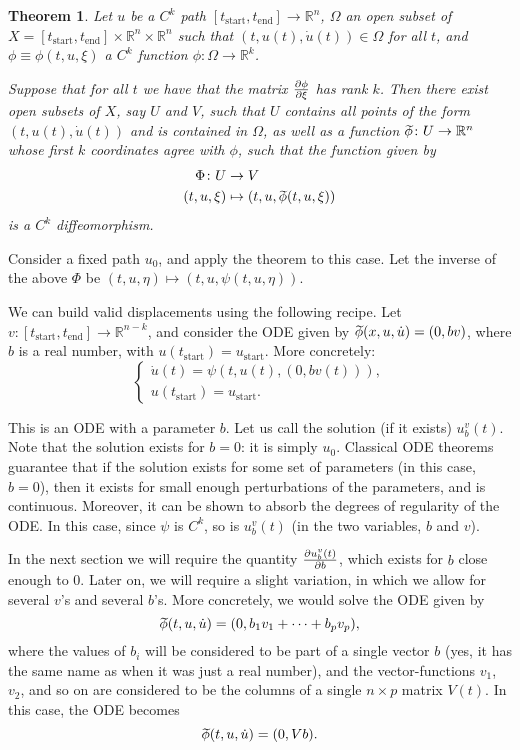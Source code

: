 \documentclass{article}
\newtheorem{theorem}{Theorem}
\theoremstyle{nonumberplain}
\theoremstyle{nonumberplain}
\newcommand{\R}{\mathbb{R}}
\newcommand{\tstart}{\mathrm{start}}
\newcommand{\tend}{\mathrm{end}}
\newcommand{\wtphi}{
  \mspace{2mu}
  \widetilde{\mspace{-2mu}\smash[t]{\phi}}
}
\begin{document}
\begin{theorem}
Let $u$ be a $C^k$ path $[t_\tstart,t_\tend] \to \R^n$, $\Omega$ an open subset of $X = [t_\tstart,t_\tend] \times \R^n \times \R^n$ such that $(t,u(t),\dot u(t)) \in \Omega$ for all $t$, and $\phi \equiv \phi(t,u,\xi)$ a $C^k$ function $\phi \colon \Omega \to \R^k$.

Suppose that for all $t$ we have that the matrix $\diffp\phi\xi$ has rank $k$. Then there exist open subsets of $X$, say $U$ and $V$, such that $U$ contains all points of the form $(t,u(t),\dot u(t))$ and is contained in $\Omega$, as well as a function $\wtphi \colon U \to \R^n$ whose first $k$ coordinates agree with $\phi$, such that the function given by
\begin{align*}
\Phi \colon U &\to V\\
(t,u,\xi) &\mapsto (t,u,\wtphi(t,u,\xi))
\end{align*}
is a $C^k$ diffeomorphism.
\end{theorem}

Consider a fixed path $u_0$, and apply the theorem to this case. Let the inverse of the above $\Phi$ be $(t,u,\eta) \mapsto (t,u,\psi(t,u,\eta))$.

We can build valid displacements using the following recipe. Let $v \colon [t_\tstart, t_\tend] \to \R^{n-k}$, and consider the ODE given by $\wtphi(x,u,\dot u) = (0, b v)$, where $b$ is a real number, with $u(t_\tstart) = u_\tstart$. More concretely:
\[
\begin{cases}
\dot u(t) = \psi(t, u(t), (0, b v(t))),\\
u(t_\tstart) = u_\tstart.
\end{cases}
\]

This is an ODE with a parameter $b$. Let us call the solution (if it exists) $u_b^v(t)$. Note that the solution exists for $b = 0$: it is simply $u_0$. Classical ODE theorems guarantee that if the solution exists for some set of parameters (in this case, $b = 0$), then it exists for small enough perturbations of the parameters, and is continuous. Moreover, it can be shown to absorb the degrees of regularity of the ODE. In this case, since $\psi$ is $C^k$, so is $u_b^v(t)$ (in the two variables, $b$ and $v$).

In the next section we will require the quantity $\diffp{u_b^v(t)}b$, which exists for $b$ close enough to 0. Later on, we will require a slight variation, in which we allow for several $v$'s and several $b$'s. More concretely, we would solve the ODE given by
\[\wtphi(t,u,\dot u) = (0, b_1 v_1 + \dots + b_p v_p),\]
where the values of $b_i$ will be considered to be part of a single vector $b$ (yes, it has the same name as when it was just a real number), and the vector-functions $v_1$, $v_2$, and so on are considered to be the columns of a single $n \times p$ matrix $V(t)$. In this case, the ODE becomes
\[\wtphi(t,u,\dot u) = (0, V b).\]
\end{document}
